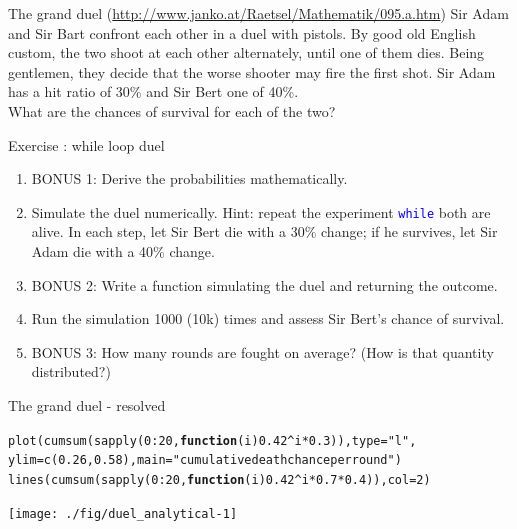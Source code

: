 \documentclass[xcolor=table,           xcolor=dvipsnames]{beamer}\usepackage[]{graphicx}\usepackage[]{color}
\makeatletter
\newcommand{\hlnum}[1]{\textcolor[rgb]{0,0,0}{#1}}
\newcommand{\hlstr}[1]{\textcolor[rgb]{0.545,0.137,0.137}{#1}}
\newcommand{\hlopt}[1]{\textcolor[rgb]{0,0,0}{#1}}
\newcommand{\hlstd}[1]{\textcolor[rgb]{0,0,0}{#1}}
\newcommand{\hlkwa}[1]{\textcolor[rgb]{1,0,0}{\textbf{#1}}}
\newcommand{\hlkwc}[1]{\textcolor[rgb]{1,0,1}{#1}}
\newcommand{\hlkwd}[1]{\textcolor[rgb]{0,0,1}{#1}}
\newenvironment{kframe}{%
 \def\at@end@of@kframe{}%
 \ifinner\ifhmode%
  \def\at@end@of@kframe{\end{minipage}}%
  \begin{minipage}{\columnwidth}%
 \fi\fi%
 \def\FrameCommand##1{\hskip\@totalleftmargin \hskip-\fboxsep
 \colorbox{shadecolor}{##1}\hskip-\fboxsep
     \hskip-\linewidth \hskip-\@totalleftmargin \hskip\columnwidth}%
 \MakeFramed {\advance\hsize-\width
   \@totalleftmargin\z@ \linewidth\hsize
   \@setminipage}}%
 {\par\unskip\endMakeFramed%
 \at@end@of@kframe}
\newenvironment{knitrout}{}{} %
\newcounter{exercisecount}
\newenvironment{exercise}[1]
{%
\stepcounter{exercisecount}
\begin{block}{Exercise \arabic{exercisecount}: #1}
}
{%
\end{block} }
\newcommand{\rcode}[1]{\texttt{\textcolor{Blue}{#1}}} %
\makeatother
\begin{document}
\begin{frame}[fragile]{The grand duel {\scriptsize (\url{http://www.janko.at/Raetsel/Mathematik/095.a.htm})}}
Sir Adam and Sir Bart confront each other in a duel with pistols.
By good old English custom, the two shoot at each other alternately, until one of them dies.
Being gentlemen, they decide that the worse shooter may fire the first shot.
Sir Adam has a hit ratio of 30\% and Sir Bert one of 40\%.\\
What are the chances of survival for each of the two?\\
\small
\begin{exercise}{while loop duel}
\begin{enumerate}
\item BONUS 1: Derive the probabilities mathematically.
\item Simulate the duel numerically. Hint: repeat the experiment \rcode{while} both are alive. In each step, let Sir Bert die with a 30\% change; if he survives, let Sir Adam die with a 40\% change.
\item BONUS 2: Write a function simulating the duel and returning the outcome.
\item Run the simulation 1000 (10k) times and assess Sir Bert's chance of survival.
\item BONUS 3: How many rounds are fought on average? (How is that quantity distributed?)
\end{enumerate}
\end{exercise}
\normalsize
\end{frame}


\begin{frame}[fragile]{The grand duel - resolved}
\begin{knitrout}\small
{}\color{fgcolor}\begin{kframe}
\begin{alltt}
\hlkwd{plot}\hlstd{(}\hlkwd{cumsum}\hlstd{(}\hlkwd{sapply}\hlstd{(}\hlnum{0}\hlopt{:}\hlnum{20}\hlstd{,} \hlkwa{function}\hlstd{(}\hlkwc{i}\hlstd{)} \hlnum{0.42}\hlopt{^}\hlstd{i}\hlopt{*}\hlnum{0.3}\hlstd{)),} \hlkwc{type}\hlstd{=}\hlstr{"l"}\hlstd{,}
     \hlkwc{ylim}\hlstd{=}\hlkwd{c}\hlstd{(}\hlnum{0.26}\hlstd{,}\hlnum{0.58}\hlstd{),} \hlkwc{main}\hlstd{=}\hlstr{"cumulative death chance per round"}\hlstd{)}
\hlkwd{lines}\hlstd{(}\hlkwd{cumsum}\hlstd{(}\hlkwd{sapply}\hlstd{(}\hlnum{0}\hlopt{:}\hlnum{20}\hlstd{,} \hlkwa{function}\hlstd{(}\hlkwc{i}\hlstd{)} \hlnum{0.42}\hlopt{^}\hlstd{i}\hlopt{*}\hlnum{0.7}\hlopt{*}\hlnum{0.4}\hlstd{)),} \hlkwc{col}\hlstd{=}\hlnum{2}\hlstd{)}
\end{alltt}
\end{kframe}

{\centering \texttt{[image: ./fig/duel\_analytical-1]} 

}



\end{knitrout}
\end{frame}
\end{document}
